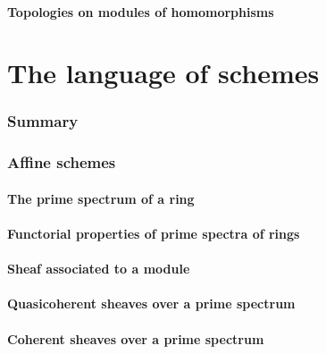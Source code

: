 \documentclass[10pt,oneside]{amsart}
\begin{document}
        \subsection{Topologies on modules of homomorphisms}
        

\clearpage

\setcounter{subsection}{0}
\part{The language of schemes}
    
    \section*{Summary}
    

    \section{Affine schemes}
       
        \subsection{The prime spectrum of a ring}
        
       
        \subsection{Functorial properties of prime spectra of rings}
        
       
        \subsection{Sheaf associated to a module}
        
       
        \subsection{Quasicoherent sheaves over a prime spectrum}
        
      
        \subsection{Coherent sheaves over a prime spectrum}
        
       
\end{document}
